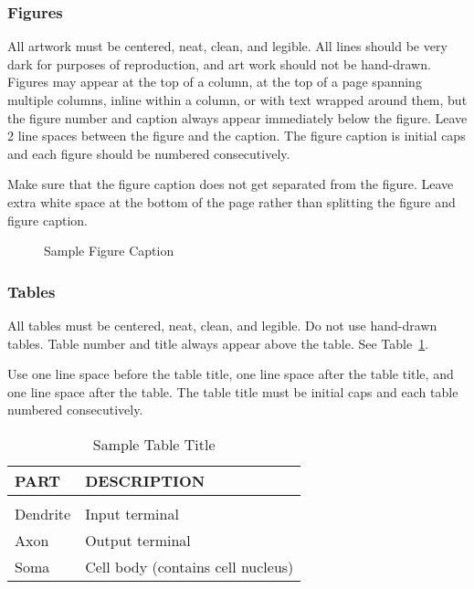 \documentclass[twoside]{article}
\begin{document}
\subsubsection{Figures}

All artwork must be centered, neat, clean, and legible.  All lines
should be very dark for purposes of reproduction, and art work should
not be hand-drawn.  Figures may appear at the top of a column, at the
top of a page spanning multiple columns, inline within a column, or
with text wrapped around them, but the figure number and caption
always appear immediately below the figure.  Leave 2 line spaces
between the figure and the caption. The figure caption is initial caps
and each figure should be numbered consecutively.

Make sure that the figure caption does not get separated from the
figure. Leave extra white space at the bottom of the page rather than
splitting the figure and figure caption.
\begin{figure}[h]
  \vspace{.3in}
  \centerline{}
  \vspace{.3in}
  \caption{Sample Figure Caption}
\end{figure}

\subsubsection{Tables}

All tables must be centered, neat, clean, and legible. Do not use hand-drawn tables.
Table number and title always appear above the table.
See Table~\ref{sample-table}.

Use one line space before the table title, one line space after the table title,
and one line space after the table. The table title must be
initial caps and each table numbered consecutively.

\begin{table}[h]
  \caption{Sample Table Title} \label{sample-table}
  \begin{center}
    \begin{tabular}{ll}
      \textbf{PART} & \textbf{DESCRIPTION}              \\
      \hline                                            \\
      Dendrite      & Input terminal                    \\
      Axon          & Output terminal                   \\
      Soma          & Cell body (contains cell nucleus) \\
    \end{tabular}
  \end{center}
\end{table}
\end{document}

